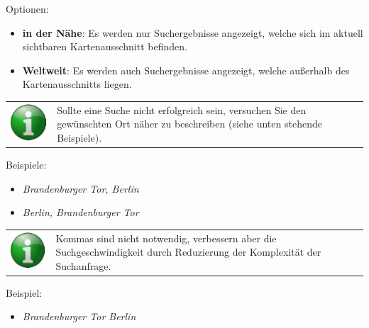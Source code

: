 \documentclass[10pt]{scrreprt}
\begin{document}
\vspace{5mm}
Optionen:
\begin{itemize}
\item \textbf{in der Nähe}: Es werden nur Suchergebnisse angezeigt, welche sich im aktuell sichtbaren Kartenausschnitt befinden.
\item \textbf{Weltweit}: Es werden auch Suchergebnisse angezeigt, welche außerhalb des Kartenausschnitts liegen.
\end{itemize}


\vspace{3mm}
\begin{tabular}{>{\centering \arraybackslash}m{1cm} m{14cm}}
\includegraphics[scale=0.5]{images/info.eps} & Sollte eine Suche nicht erfolgreich sein, versuchen Sie den gewünschten Ort näher zu beschreiben (siehe unten stehende Beispiele). \\ 
\end{tabular}

\vspace{3mm}
Beispiele: 
\begin{itemize}
\item \textit{Brandenburger Tor, Berlin}
\item \textit{Berlin, Brandenburger Tor}
\end{itemize}

\vspace{3mm}
\begin{tabular}{>{\centering \arraybackslash}m{1cm} m{14cm}}
\includegraphics[scale=0.5]{images/info.eps} & Kommas sind nicht notwendig, verbessern aber die Suchgeschwindigkeit durch Reduzierung der Komplexität der Suchanfrage. \\ 
\end{tabular} 

\vspace{3mm}
Beispiel:
\begin{itemize}
\item \textit{Brandenburger Tor Berlin}
\end{itemize}
\end{document}
